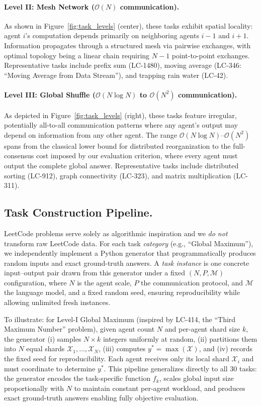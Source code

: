 \paragraph{Level II: Mesh Network ($\mathcal{O}(N)$ communication).}
As shown in Figure~\ref{fig:task_levels} (center), these tasks exhibit spatial locality: agent $i$'s computation depends primarily on neighboring agents $i-1$ and $i+1$. 
Information propagates through a structured mesh via pairwise exchanges, with optimal topology being a linear chain requiring $N-1$ point-to-point exchanges. 
Representative tasks include prefix sum (LC-1480), moving average (LC-346: ``Moving Average from Data Stream''), and trapping rain water (LC-42).

\paragraph{Level III: Global Shuffle ($\mathcal{O}(N \log N)$ to $\mathcal{O}(N^2)$ communication).}
As depicted in Figure~\ref{fig:task_levels} (right), these tasks feature irregular, potentially all-to-all communication patterns where any agent's output may depend on information from any other agent. 
The range $\mathcal{O}(N \log N)$--$\mathcal{O}(N^2)$ spans from the classical lower bound for distributed reorganization to the full-consensus cost imposed by our evaluation criterion, where every agent must output the complete global answer. 
Representative tasks include distributed sorting (LC-912), graph connectivity (LC-323), and matrix multiplication (LC-311).


\subsection{Task Construction Pipeline.}
LeetCode problems serve solely as algorithmic inspiration and we \textit{do not} transform raw LeetCode data. 
For each task \emph{category} (e.g., ``Global Maximum''), we independently implement a Python generator that programmatically produces random inputs and exact ground-truth answers. 
A \emph{task instance} is one concrete input--output pair drawn from this generator under a fixed $(N, P, \mathcal{M})$ configuration, where $N$ is the agent scale, $P$ the communication protocol, and $\mathcal{M}$ the language model, and a fixed random seed, ensuring reproducibility while allowing unlimited fresh instances.

To illustrate: for Level-I Global Maximum (inspired by LC-414, the ``Third Maximum Number'' problem), given agent count $N$ and per-agent shard size $k$, the generator (i) samples $N \times k$ integers uniformly at random, (ii) partitions them into $N$ equal shards $\mathcal{X}_1,\ldots,\mathcal{X}_N$, (iii) computes $y^* = \max(\mathcal{X})$, and (iv) records the fixed seed for reproducibility. 
Each agent receives only its local shard $\mathcal{X}_i$ and must coordinate to determine $y^*$. 
This pipeline generalizes directly to all 30 tasks: the generator encodes the task-specific function $f_k$, scales global input size proportionally with $N$ to maintain constant per-agent workload, and produces exact ground-truth answers enabling fully objective evaluation.



